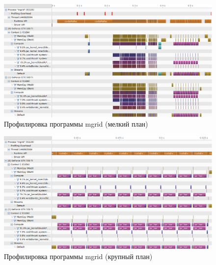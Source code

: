 \documentclass[12pt, a4paper]{article}
\begin{document}
        \begin{figure}[H]
            \centering
            \caption{Профилировка программы mgrid (мелкий план)}
            \label{fig:prof_mgrid}
            \includegraphics[width=\textwidth]{pics/prof_mgrid}
        \end{figure}
        \begin{figure}[H]
            \centering
            \caption{Профилировка программы mgrid (крупный план)}
            \label{fig:prof_mgrid_zoomed}
            \includegraphics[width=\textwidth]{pics/prof_mgrid_zoomed}
        \end{figure}
\end{document}
